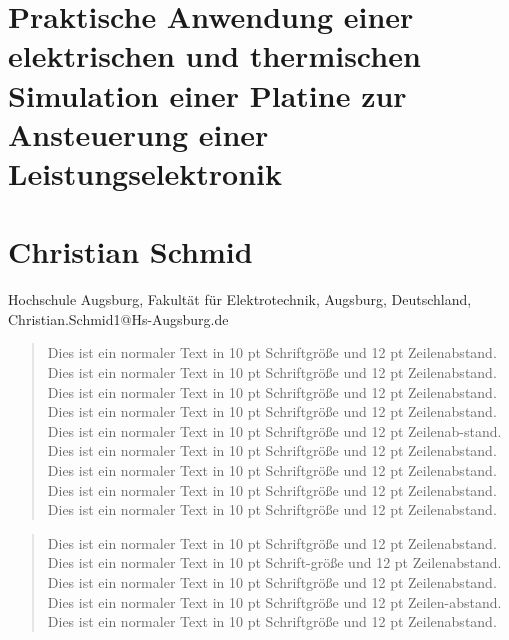 \documentclass[10pt,a4paper,oneside,abstracton]{scrartcl}
\begin{document}
\section*{Praktische Anwendung einer elektrischen und thermischen Simulation einer Platine zur Ansteuerung einer Leistungselektronik}
\section*{Christian Schmid}
Hochschule Augsburg, Fakultät für Elektrotechnik, Augsburg, Deutschland, Christian.Schmid1@Hs-Augsburg.de 


\begin{abstract} %
\noindent %
Dies ist ein normaler Text in 10 pt Schriftgröße und 12 pt Zeilenabstand. Dies ist ein normaler Text in 10 pt Schriftgröße und 12 pt Zeilenabstand. Dies ist ein normaler Text in 10 pt Schriftgröße und 12 pt Zeilenabstand. Dies ist ein normaler Text in 10 pt Schriftgröße und 12 pt Zeilenabstand. Dies ist ein normaler Text in 10 pt Schriftgröße und 12 pt Zeilenab-stand. Dies ist ein normaler Text in 10 pt Schriftgröße und 12 pt Zeilenabstand. Dies ist ein normaler Text in 10 pt Schriftgröße und 12 pt Zeilenabstand. Dies ist ein normaler Text in 10 pt Schriftgröße und 12 pt Zeilenabstand. Dies ist ein normaler Text in 10 pt Schriftgröße und 12 pt Zeilenabstand.
\end{abstract}

\renewcommand{\abstractname}{Abstract} %

\begin{abstract}
\noindent %
Dies ist ein normaler Text in 10 pt Schriftgröße und 12 pt Zeilenabstand. Dies ist ein normaler Text in 10 pt Schrift-größe und 12 pt Zeilenabstand. Dies ist ein normaler Text in 10 pt Schriftgröße und 12 pt Zeilenabstand. Dies ist ein normaler Text in 10 pt Schriftgröße und 12 pt Zeilen-abstand. Dies ist ein normaler Text in 10 pt Schriftgröße und 12 pt Zeilenabstand.
\end{abstract}
\end{document}
